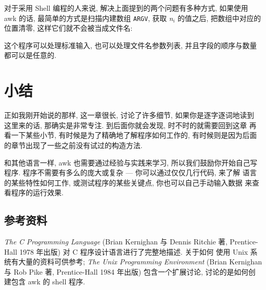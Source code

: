 对于采用 Shell 编程的人来说, 解决上面提到的两个问题有多种方式, 如果使用 
awk 的话, 最简单的方式是扫描内建数组 \verb'ARGV', 获取 \textit{n}$_i$
的值之后, 把数组中对应的位置清零, 这样它们就不会被当成文件名:
这个程序可以处理标准输入, 也可以处理文件名参数列表, 并且字段的顺序与数量
都可以是任意的.

\section{小结}
\label{sec:the_awk_language_summary}

正如我刚开始说的那样, 这一章很长, 讨论了许多细节, 如果你是逐字逐词地读到
这里来的话, 那确实是非常专注. 到后面你就会发现, 时不时的就需要回到这章
再看一下某些小节, 有时候是为了精确地了解程序如何工作的, 有时候则是因为后面
的章节出现了一些之前没有试过的构造方法.

和其他语言一样, awk 也需要通过经验与实践来学习, 所以我们鼓励你开始自己写
程序. 程序不需要有多么的庞大或复杂 --- 你可以通过仅仅几行代码, 来了解
语言的某些特性如何工作, 或测试程序的某些关键点, 你也可以自己手动输入数据
来查看程序的运行效果.

\subsection*{参考资料}
\label{subsec:bibliographic_notes}

\textit{The C Programming Language} (Brian Kernighan 与 Dennis Ritchie 著,
Prentice-Hall 1978 年出版) 对 C 程序设计语言进行了完整地描述. 关于如何 
使用 Unix 系统有大量的资料可供参考; \textit{The Unix Programming 
Environment} (Brian Kernighan 与 Rob Pike 著, Prentice-Hall 1984 年出版)
包含一个扩展讨论, 讨论的是如何创建包含 awk 的 shell 程序.
